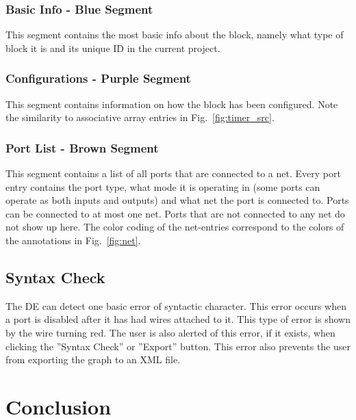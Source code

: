 \documentclass[journal,comsoc]{IEEEtran}
\begin{document}
\subsubsection{Basic Info - Blue Segment}
This segment contains the most basic info about the block, namely
what type of block it is and its unique ID in the current project.

\subsubsection{Configurations - Purple Segment}
This segment contains information on how the block has been configured. Note
the similarity to associative array entries in Fig.~\ref{fig:timer_src}.

\subsubsection{Port List - Brown Segment}
This segment contains a list of all ports that are connected to a net. Every port entry contains
the port type, what mode it is operating in (some ports can operate as both inputs and outputs)
and what net the port is connected to. Ports can be connected to at most one net. Ports that
are not connected to any net do not show up here. The color coding of the net-entries correspond
to the colors of the annotations in Fig.~\ref{fig:net}.

\subsection{Syntax Check}
The DE can detect one basic error of syntactic character. This error occurs when a port is
disabled after it has had wires attached to it. This type of error is shown by the wire turning
red. The user is also alerted of this error, if it exists, when clicking the ''Syntax Check''
or ''Export'' button. This error also prevents the user from exporting the graph to an XML file.

\label{sec:xml}
\section{Conclusion}
\end{document}
